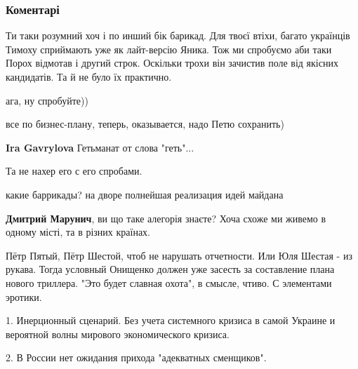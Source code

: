  
 
 
 
 
\subsubsection{Коментарі}
\label{sec:24_05_2018.fb.lesev_igor.1.ukraina_posle_poroshenko.cmt}

\begin{itemize} %
Ти таки розумний хоч і по инший бік барикад.
Для твоєї втіхи, багато українців Тимоху сприймають уже як лайт-версію Яника. Тож ми спробуємо аби таки Порох відмотав і другий строк. Оскільки трохи він зачистив поле від якісних кандидатів. Та й не було їх практично.

\begin{itemize} %
ага, ну спробуйте))

все по бизнес-плану, теперь, оказывается, надо Петю сохранить)

\textbf{Ira Gavrylova} Гетьманат от слова "геть"...

Та не нахер его с его спробами.

какие баррикады? на дворе полнейшая реализация идей майдана

\textbf{Дмитрий Марунич}, ви що таке алегорія знаєте?
Хоча схоже ми живемо в одному місті, та в різних країнах.

\end{itemize} %


Пётр Пятый, Пётр Шестой, чтоб не нарушать отчетности. Или Юля Шестая - из
рукава. Тогда условный Онищенко должен уже засесть за составление плана нового
триллера. "Это будет славная охота", в смысле, чтиво. С элементами эротики.


1. Инерционный сценарий. Без учета системного кризиса в самой Украине и
вероятной волны мирового экономического кризиса. 

2. В России нет ожидания
прихода "адекватных сменщиков".


\end{itemize}
